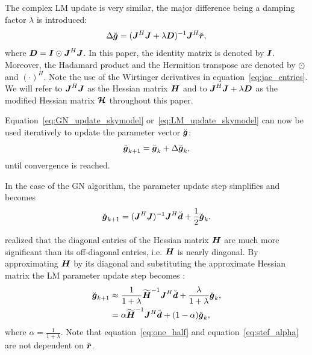 \documentclass[useAMS,usenatbib]{mn2e}
\newcommand{\br}{\bmath{r}}
\newcommand{\bg}{\bmath{g}}
\newcommand{\bd}{\bmath{d}}
\newcommand{\bJ}{\bmath{J}}
\newcommand{\bD}{\bmath{D}}
\newcommand{\bH}{\bmath{H}}
\newcommand{\bI}{\bmath{I}}
\newcommand{\bmH}{\bmath{\mathcal{H}}}
\begin{document}
The complex LM update is very similar, the major difference being a damping factor $\lambda$ is introduced:
\begin{equation}
\label{eq:LM_update_skymodel}
\Delta \breve{\bg} = (\bJ^H\bJ + \lambda\bD)^{-1}\bJ^H\breve{\br},
\end{equation}
where $\bD=\bI\odot\bJ^H\bJ$. In this paper, the identity matrix is denoted by $\bI$. Moreover, the Hadamard product and the Hermition transpose are denoted by $\odot$ and $(\cdot)^H$. Note the use of the Wirtinger derivatives in equation~\ref{eq:jac_entries}.
We will refer to $\bJ^H\bJ$ as the Hessian matrix $\bH$ and to $\bJ^H\bJ + \lambda\bD$ as the modified Hessian matrix $\bmH$ throughout this paper. 

Equation~\ref{eq:GN_update_skymodel} or~\ref{eq:LM_update_skymodel} can now be used iteratively to update the parameter vector $\breve{\bg}$:
\begin{equation}
\label{eq:update_skymodel}
\breve{\bg}_{k+1} = \breve{\bg}_{k} + \Delta \breve{\bg}_{k},
\end{equation}
until convergence is reached.

In the case of the GN algorithm, the parameter update step simplifies and becomes \citep{Smirnov2015}
\begin{equation}
\label{eq:one_half}
\breve{\bg}_{k+1} = (\bJ^H\bJ)^{-1}\bJ^H\breve{\bd} + \frac{1}{2}\breve{\bg}_{k}. 
\end{equation}


\citet{Smirnov2015} realized that the diagonal entries of the Hessian matrix $\bH$ are much more significant than its off-diagonal entries, i.e. $\bH$ is nearly diagonal. By approximating $\bH$ by its diagonal and substituting the approximate Hessian matrix the LM parameter update step becomes \citep{Smirnov2015}:
\begin{align}
\breve{\bg}_{k+1} &\approx \frac{1}{1+\lambda}\widetilde{\bH}^{-1}\bJ^H\breve{\bd} + \frac{\lambda}{1+\lambda} \breve{\bg}_k, \nonumber \\
 &= \alpha \widetilde{\bH}^{-1}\bJ^H\breve{\bd} + (1-\alpha)\breve{\bg}_k, 
\label{eq:stef_alpha}  
\end{align}
where $\alpha = \frac{1}{1+\lambda}$. Note that equation~\ref{eq:one_half} and equation~\ref{eq:stef_alpha} are   
not dependent on $\breve{\br}$. 
\end{document}

